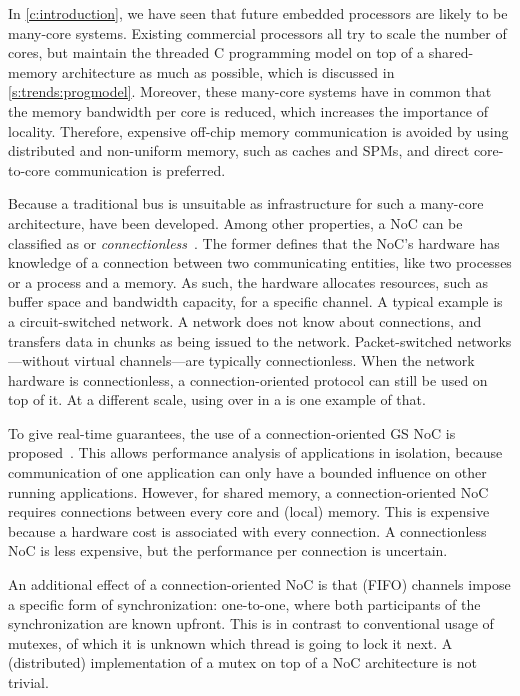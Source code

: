 In \cref{c:introduction}, we have seen that future embedded processors are likely to be many-core systems.
Existing commercial processors all try to scale the number of cores, but maintain the threaded C programming model on top of a shared-memory architecture as much as possible, which is discussed in \cref{s:trends:progmodel}.
Moreover, these many-core systems have in common that the memory bandwidth per core is reduced, which increases the importance of locality.
Therefore, expensive off-chip memory communication is avoided by using distributed and non-uniform memory, such as caches and \acp{SPM}, and direct core-to-core communication is preferred.

Because a traditional bus is unsuitable as infrastructure for such a many-core architecture,  have been developed.
Among other properties, a \ac{NoC} can be classified as \emph{} or \emph{connectionless}~\cite{meister:connection,bjerregaard:noc_survey}.
The former defines that the \ac{NoC}'s hardware has knowledge of a connection between two communicating entities, like two processes or a process and a memory.
As such, the hardware allocates resources, such as buffer space and bandwidth capacity, for a specific channel.
A typical example is a circuit-switched network.
A  network does not know about connections, and transfers data in chunks as being issued to the network.
Packet-switched networks---without virtual channels---are typically connectionless.
When the network hardware is connectionless, a connection-oriented protocol can still be used on top of it.
At a different scale, using  over  in a  is one example of that.

To give real-time guarantees, the use of a connection-oriented \acl{GS} \ac{NoC} is proposed~\cite{bjerregaard:noc_survey,demicheli:noc_research,goossens:aethereal,wolkotte:phd}.
This allows performance analysis of applications in isolation, because communication of one application can only have a bounded influence on other running applications.
However, for shared memory, a connection-oriented \ac{NoC} requires connections between every core and (local) memory.
This is expensive because a hardware cost is associated with every connection.
A connectionless \ac{NoC} is less expensive, but the performance per connection is uncertain.

An additional effect of a connection-oriented \ac{NoC} is that (\ac{FIFO}) channels impose a specific form of synchronization: one-to-one, where both participants of the synchronization are known upfront.
This is in contrast to conventional usage of mutexes, of which it is unknown which thread is going to lock it next.
A (distributed) implementation of a mutex on top of a \ac{NoC} architecture is not trivial.

